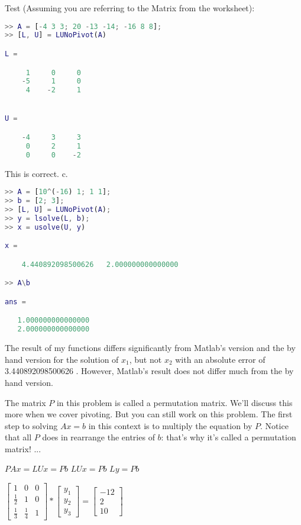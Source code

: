\documentclass[12pt]{article}
\makeatletter
\theoremstyle{homework}
\newenvironment{exercise}[1]
{\def\@currentlabel{#1}\exercisecore}
{\endexercisecore}
\makeatother
\begin{document}
Test (Assuming you are referring to the Matrix from the worksheet):
\begin{lstlisting}[language=Matlab]
>> A = [-4 3 3; 20 -13 -14; -16 8 8];
>> [L, U] = LUNoPivot(A)

L =

	 1     0     0
	-5     1     0
	 4    -2     1


U =

	-4     3     3
	 0     2     1
	 0     0    -2
\end{lstlisting}
This is correct. c.
\begin{lstlisting}[language=Matlab]
>> A = [10^(-16) 1; 1 1];
>> b = [2; 3];
>> [L, U] = LUNoPivot(A);
>> y = lsolve(L, b);
>> x = usolve(U, y)

x =

	4.440892098500626   2.000000000000000

>> A\b

ans =

   1.000000000000000
   2.000000000000000
\end{lstlisting}
The result of my functions differs significantly from Matlab's version and the by hand
version for the solution of $x_1$, but not $x_2$ with an absolute error of 3.440892098500626
. However, Matlab's result does not differ much from the by hand version.

\begin{exercise}{Problem 7.4}  The matrix $P$ in this
problem is called a permutation matrix.  We'll discuss this more when we
cover pivoting.  But you can still work on this problem. The
first step to solving $Ax=b$ in this context is to multiply the equation
by $P$.  Notice that all $P$ does in rearrange the entries of $b$: that's
why it's called a permutation matrix!
\end{exercise}
... 
 
\newline
$PAx = LUx = Pb$\newline 
$LUx = Pb$\newline
$Ly = Pb$\newline
 
\newline
$\begin{bmatrix}
1& 0& 0\\
\frac{1}{2}& 1& 0\\
\frac{1}{3}& \frac{1}{4}& 1
\end{bmatrix}
*
\begin{bmatrix}
y_1\\
y_2\\
y_3
\end{bmatrix}
=
\begin{bmatrix}
-12\\
2\\
10
\end{bmatrix}$\newline
 
\end{document}
